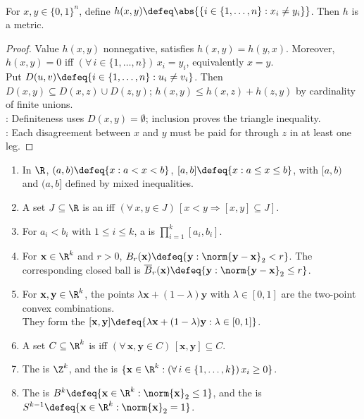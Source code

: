 \begin{example} \label{ex:hamming-distance} \\
For $x,y\in\{0,1\}^n$, define $h(x,y)\defeq\abs{\{i\in\{1,\ldots,n\}:x_i\neq y_i\}}$. Then $h$ is a metric.
\begin{proof} Value $h(x,y)$ nonnegative, satisfies $h(x,y)=h(y,x)$. Moreover, $h(x,y)=0$ iff $(\forall\,i\in\{1,\ldots,n\})\,x_i=y_i$, equivalently $x=y$.\\
Put $D(u,v)\defeq\{i\in\{1,\ldots,n\}:u_i\neq v_i\}$. Then $D(x,y)\subseteq D(x,z)\cup D(z,y)$; $h(x,y)\leq h(x,z)+h(z,y)$ by cardinality of finite unions.\\
: Definiteness uses $D(x,y)=\emptyset$; inclusion proves the triangle inequality.\\
: Each disagreement between $x$ and $y$ must be paid for through $z$ in at least one leg.
\end{proof}
\end{example}

\begin{definition} \label{def:euclidean-intervals-cells-balls-convex} 
\begin{enumerate}[label=(\roman*)]
\setlength{\itemsep}{0pt}
\item In $\R$, $(a,b)\defeq\{x:a<x<b\}$, $[a,b]\defeq\{x:a\leq x\leq b\}$, with $[a,b)$ and $(a,b]$ defined by mixed inequalities.
\item A set $J\subseteq\R$ is an  iff $(\forall\,x,y\in J)\,[x<y\Rightarrow[x,y]\subseteq J]$.
\item For $a_i<b_i$ with $1\leq i\leq k$, a  is $\prod\limits_{i=1}^{k}[a_i,b_i]$.
\item For $\mathbf{x}\in\R^k$ and $r>0$, $B_r(\mathbf{x})\defeq\{\mathbf{y}:\norm{\mathbf{y}-\mathbf{x}}_2<r\}$. The corresponding closed ball is $\overline{B}_r(\mathbf{x})\defeq\{\mathbf{y}:\norm{\mathbf{y}-\mathbf{x}}_2\leq r\}$.
\item For $\mathbf{x},\mathbf{y}\in\R^k$, the points $\lambda\mathbf{x}+(1-\lambda)\mathbf{y}$ with $\lambda\in[0,1]$ are the two-point convex combinations.\\
They form the  $[\mathbf{x},\mathbf{y}]\defeq\{\lambda\mathbf{x}+(1-\lambda)\mathbf{y}:\lambda\in[0,1]\}$.
\item A set $C\subseteq\R^k$ is  iff $(\forall\,\mathbf{x},\mathbf{y}\in C)\,[\mathbf{x},\mathbf{y}]\subseteq C$.
\item The  is $\Z^k$, and the  is $\{\mathbf{x}\in\R^k:(\forall\,i\in\{1,\ldots,k\})\,x_i\geq0\}$.
\item The  is $B^k\defeq\{\mathbf{x}\in\R^k:\norm{\mathbf{x}}_2\leq1\}$, and the  is $S^{k-1}\defeq\{\mathbf{x}\in\R^k:\norm{\mathbf{x}}_2=1\}$.
\end{enumerate}
\end{definition}

